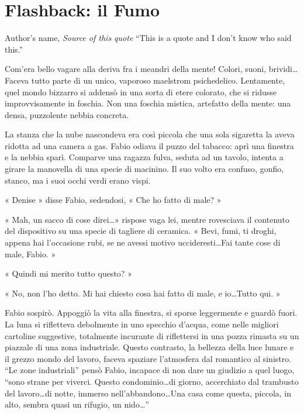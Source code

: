 \chapter{Flashback: il Fumo}

\begin{chapquote}{Author's name, \textit{Source of this quote}}
``This is a quote and I don't know who said this.''
\end{chapquote}

Com'era bello vagare alla deriva fra i meandri della mente! Colori, suoni, brividi\ldots Faceva tutto parte di un unico, vaporoso maelstrom psichedelico. Lentamente, quel mondo bizzarro si addensò in una sorta di etere colorato, che si ridusse improvvisamente in foschia. Non una foschia mistica, artefatto della mente: una densa, puzzolente nebbia concreta.

La stanza che la nube nascondeva era così piccola che una sola sigaretta la aveva ridotta ad una camera a gas. Fabio odiava il puzzo del tabacco: aprì una finestra e la nebbia sparì. Comparve una ragazza fulva, seduta ad un tavolo, intenta a girare la manovella di una specie di macinino. Il suo volto era confuso, gonfio, stanco, ma i suoi occhi verdi erano vispi.

« Denise » disse Fabio, sedendosi, « Che ho fatto di male? »

« Mah, un sacco di cose direi\ldots » rispose vaga lei, mentre rovesciava il contenuto del dispositivo su una specie di tagliere di ceramica. « Bevi, fumi, ti droghi, appena hai l'occasione rubi, se ne avessi motivo uccideresti\ldots Fai tante cose di male, Fabio. »

« Quindi mi merito tutto questo? »

« No, non l'ho detto. Mi hai chiesto cosa hai fatto di male, e io\ldots Tutto qui. »

Fabio sospirò. Appoggiò la vita alla finestra, si sporse leggermente e guardò fuori. La luna si rifletteva debolmente in uno specchio d'acqua, come nelle migliori cartoline suggestive, totalmente incurante di riflettersi in una pozza rimasta su un piazzale di una zona industriale. Questo contrasto, la bellezza della luce lunare e il grezzo mondo del lavoro, faceva spaziare l'atmosfera dal romantico al sinistro. ``Le zone industriali'' pensò Fabio, incapace di non dare un giudizio a quel luogo, ``sono strane per viverci. Questo condominio\ldots di giorno, accerchiato dal trambusto del lavoro\ldots di notte, immerso nell'abbandono\ldots Una casa come questa, piccola, in alto, sembra quasi un rifugio, un nido\ldots''

